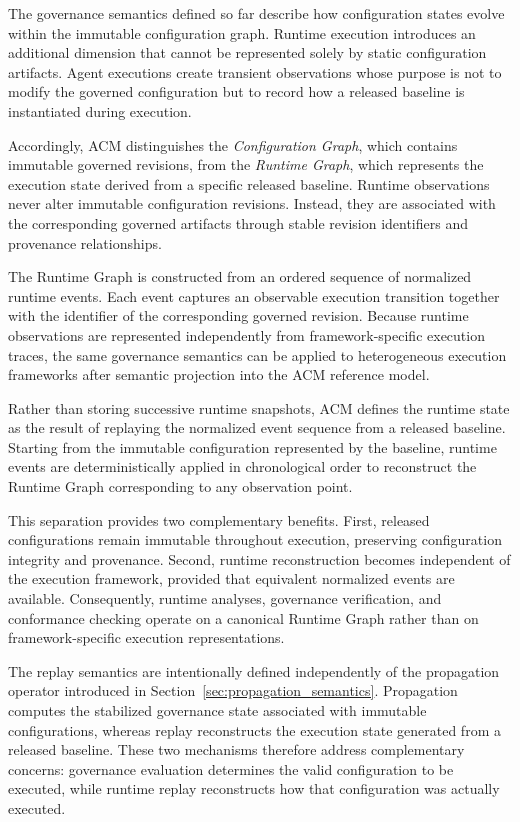 \documentclass[10pt]{article}
\begin{document}
	The governance semantics defined so far describe how configuration states evolve
	within the immutable configuration graph. Runtime execution introduces an
	additional dimension that cannot be represented solely by static configuration
	artifacts. Agent executions create transient observations whose purpose is not
	to modify the governed configuration but to record how a released baseline is
	instantiated during execution.
	
	Accordingly, ACM distinguishes the \emph{Configuration Graph}, which contains
	immutable governed revisions, from the \emph{Runtime Graph}, which represents
	the execution state derived from a specific released baseline. Runtime
	observations never alter immutable configuration revisions. Instead, they are
	associated with the corresponding governed artifacts through stable revision
	identifiers and provenance relationships.
	
	The Runtime Graph is constructed from an ordered sequence of normalized runtime
	events. Each event captures an observable execution transition together with the
	identifier of the corresponding governed revision. Because runtime observations
	are represented independently from framework-specific execution traces, the same
	governance semantics can be applied to heterogeneous execution frameworks after
	semantic projection into the ACM reference model.
	
	Rather than storing successive runtime snapshots, ACM defines the runtime state
	as the result of replaying the normalized event sequence from a released
	baseline. Starting from the immutable configuration represented by the baseline,
	runtime events are deterministically applied in chronological order to
	reconstruct the Runtime Graph corresponding to any observation point.
	
	This separation provides two complementary benefits. First, released
	configurations remain immutable throughout execution, preserving configuration
	integrity and provenance. Second, runtime reconstruction becomes independent of
	the execution framework, provided that equivalent normalized events are
	available. Consequently, runtime analyses, governance verification, and
	conformance checking operate on a canonical Runtime Graph rather than on
	framework-specific execution representations.
	
	The replay semantics are intentionally defined independently of the propagation
	operator introduced in Section~\ref{sec:propagation_semantics}. Propagation
	computes the stabilized governance state associated with immutable
	configurations, whereas replay reconstructs the execution state generated from a
	released baseline. These two mechanisms therefore address complementary
	concerns: governance evaluation determines the valid configuration to be
	executed, while runtime replay reconstructs how that configuration was actually
	executed.
	
\end{document}
